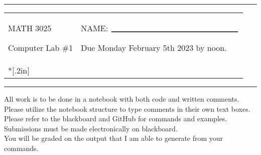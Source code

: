 \documentclass[11pt]{article}
\begin{document}
\newcommand{\dsp}{\displaystyle}
\newcommand{\ihat}{{\bf{i}}}
\newcommand{\jhat}{{\bf{j}}}
\newcommand{\khat}{{\bf{k}}}
\newcommand{\Fhat}{{\bf{F}}}

\thispagestyle{empty}

\noindent
\sffamily
\begin{center}
\rule{7.5in}{2pt}

\vspace{.2in}

\begin{tabular}{p{4in}p{3.5in}}
MATH 3025

\vspace{.2in}

Computer Lab \#1
& 
NAME:  $_{\rule{2.5in}{1pt}}$

\vspace{.2in}

Due Monday February 5th 2023 by noon.
\\*[.2in]
\end{tabular}
\rule{7.5in}{2pt}

\vspace{.1in}
All work is to be done in a notebook with both code and written comments.  Please utilize the notebook structure to type comments in their own text boxes. \\
 Please refer to the blackboard and GitHub for commands and examples. \\
 Submissions must be made electronically on blackboard. \\
   You will be graded on the output that I am able to generate from your commands.\\
\end{center}
\end{document}

